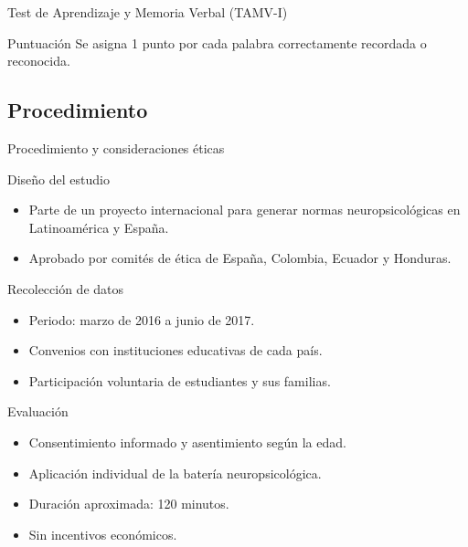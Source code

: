 \documentclass[aspectratio=169]{beamer}
\begin{document}
\begin{frame}{Test de Aprendizaje y Memoria Verbal (TAMV-I)}
	
	\begin{alertblock}{Puntuación}
		Se asigna 1 punto por cada palabra correctamente recordada o reconocida.
	\end{alertblock}
\end{frame}

\subsection{Procedimiento}

\begin{frame}{Procedimiento y consideraciones éticas}
	\scriptsize
	\begin{block}{Diseño del estudio}
		\begin{itemize}
			\item Parte de un proyecto internacional para generar normas neuropsicológicas en Latinoamérica y España.
			\item Aprobado por comités de ética de España, Colombia, Ecuador y Honduras.
		\end{itemize}
	\end{block}
	
	\begin{block}{Recolección de datos}
		\begin{itemize}
			\item Periodo: marzo de 2016 a junio de 2017.
			\item Convenios con instituciones educativas de cada país.
			\item Participación voluntaria de estudiantes y sus familias.
		\end{itemize}
	\end{block}
	
	\begin{block}{Evaluación}
		\begin{itemize}
			\item Consentimiento informado y asentimiento según la edad.
			\item Aplicación individual de la batería neuropsicológica.
			\item Duración aproximada: 120 minutos.
			\item Sin incentivos económicos.
		\end{itemize}
	\end{block}
	
\end{frame}
\end{document}
